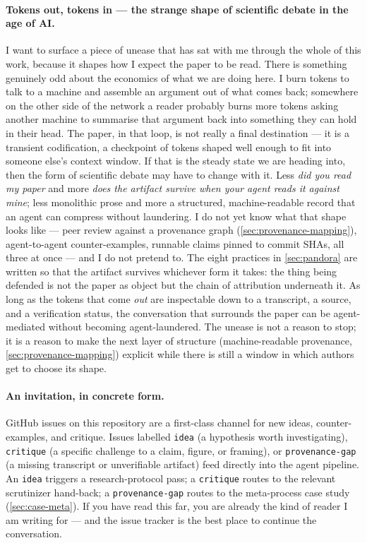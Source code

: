 \documentclass[11pt,a4paper]{article}
\begin{document}
\paragraph{Tokens out, tokens in --- the strange shape of scientific
debate in the age of AI.}
I want to surface a piece of unease that has sat with me through the
whole of this work, because it shapes how I expect the paper to be
read. There is something genuinely odd about the economics of what we
are doing here. I burn tokens to talk to a machine and assemble an
argument out of what comes back; somewhere on the other side of the
network a reader probably burns more tokens asking another machine to
summarise that argument back into something they can hold in their
head. The paper, in that loop, is not really a final destination ---
it is a transient codification, a checkpoint of tokens shaped well
enough to fit into someone else's context window. If that is the
steady state we are heading into, then the form of scientific debate
may have to change with it. Less \emph{did you read my paper} and more
\emph{does the artifact survive when your agent reads it against
mine}; less monolithic prose and more a structured, machine-readable
record that an agent can compress without laundering. I do not yet
know what that shape looks like --- peer review against a provenance
graph (\cref{sec:provenance-mapping}), agent-to-agent counter-examples,
runnable claims pinned to commit SHAs, all three at once --- and I
do not pretend to. The eight practices in \cref{sec:pandora}
are written so that the artifact survives whichever form it takes:
the thing being defended is not the paper as object but the chain of
attribution underneath it. As long as the tokens that come \emph{out}
are inspectable down to a transcript, a source, and a verification
status, the conversation that surrounds the paper can be
agent-mediated without becoming agent-laundered. The unease is not a
reason to stop; it is a reason to make the next layer of structure
(machine-readable provenance, \cref{sec:provenance-mapping}) explicit
while there is still a window in which authors get to choose its
shape.

\paragraph{An invitation, in concrete form.}
GitHub issues on this repository are a first-class channel for new
ideas, counter-examples, and critique. Issues labelled \texttt{idea}
(a hypothesis worth investigating), \texttt{critique} (a specific
challenge to a claim, figure, or framing), or \texttt{provenance-gap}
(a missing transcript or unverifiable artifact) feed directly into the
agent pipeline. An \texttt{idea} triggers a research-protocol pass; a
\texttt{critique} routes to the relevant scrutinizer hand-back; a
\texttt{provenance-gap} routes to the meta-process case study
(\cref{sec:case-meta}). If you have
read this far, you are already the kind of reader I am writing for ---
and the issue tracker is the best place to continue the conversation.
\end{document}
